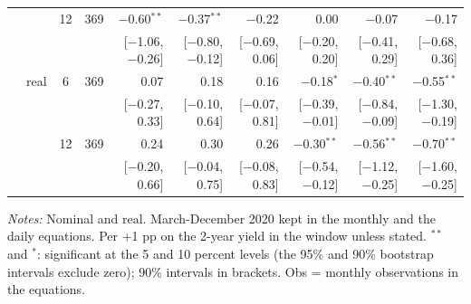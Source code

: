 \begin{longtable}{llcrrrrrrr}
 &  & 12 & 369 & $-$0.60$^{**}$ & $-$0.37$^{**}$ & $-$0.22 & 0.00 & $-$0.07 & $-$0.17\\
 & & & & {\scriptsize [$-$1.06, $-$0.26]} & {\scriptsize [$-$0.80, $-$0.12]} & {\scriptsize [$-$0.69, 0.06]} & {\scriptsize [$-$0.20, 0.20]} & {\scriptsize [$-$0.41, 0.29]} & {\scriptsize [$-$0.68, 0.36]}\\
 & real & 6 & 369 & 0.07 & 0.18 & 0.16 & $-$0.18$^{*}$ & $-$0.40$^{**}$ & $-$0.55$^{**}$\\
 & & & & {\scriptsize [$-$0.27, 0.33]} & {\scriptsize [$-$0.10, 0.64]} & {\scriptsize [$-$0.07, 0.81]} & {\scriptsize [$-$0.39, $-$0.01]} & {\scriptsize [$-$0.84, $-$0.09]} & {\scriptsize [$-$1.30, $-$0.19]}\\
 &  & 12 & 369 & 0.24 & 0.30 & 0.26 & $-$0.30$^{**}$ & $-$0.56$^{**}$ & $-$0.70$^{**}$\\
 & & & & {\scriptsize [$-$0.20, 0.66]} & {\scriptsize [$-$0.04, 0.75]} & {\scriptsize [$-$0.08, 0.83]} & {\scriptsize [$-$0.54, $-$0.12]} & {\scriptsize [$-$1.12, $-$0.25]} & {\scriptsize [$-$1.60, $-$0.25]}\\
\end{longtable}
\begin{flushleft}\footnotesize\textit{Notes:} Nominal and real. March-December 2020 kept in the monthly and the daily equations. Per +1 pp on the 2-year yield in the window unless stated. $^{**}$ and $^{*}$: significant at the 5 and 10 percent levels (the 95\% and 90\% bootstrap intervals exclude zero); 90\% intervals in brackets. Obs = monthly observations in the equations.\end{flushleft}
\endgroup
